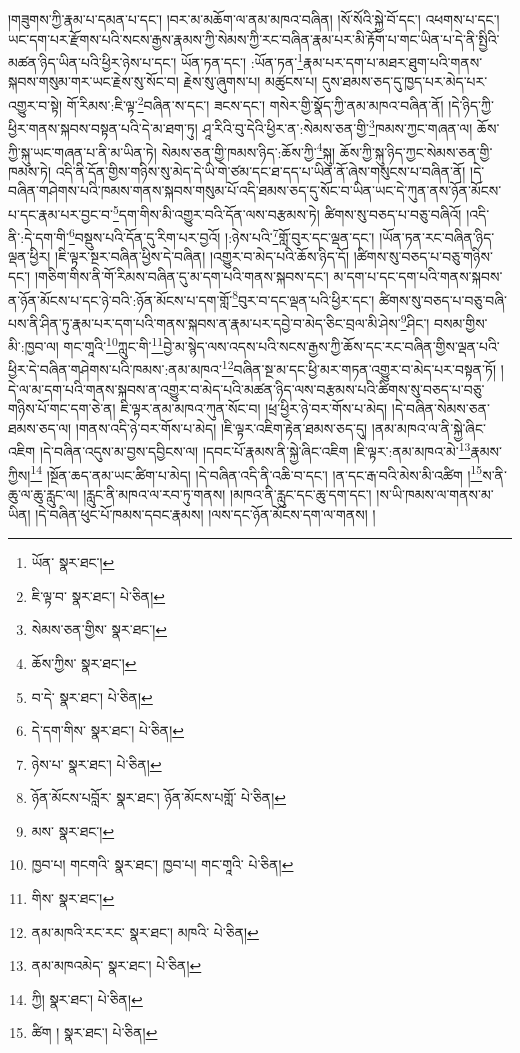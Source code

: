 །གཟུགས་ཀྱི་རྣམ་པ་དམན་པ་དང་། །བར་མ་མཆོག་ལ་ནམ་མཁའ་བཞིན། །སོ་སོའི་སྐྱེ་བོ་དང་། འཕགས་པ་དང་། ཡང་དག་པར་རྫོགས་པའི་སངས་རྒྱས་རྣམས་ཀྱི་སེམས་ཀྱི་རང་བཞིན་རྣམ་པར་མི་རྟོག་པ་གང་ཡིན་པ་དེ་ནི་སྤྱིའི་མཚན་ཉིད་ཡིན་པའི་ཕྱིར་ཉེས་པ་དང་། ཡོན་ཏན་དང་། :ཡོན་ཏན་\footnote{ཡོན་  སྣར་ཐང་། }རྣམ་པར་དག་པ་མཐར་ཐུག་པའི་གནས་སྐབས་གསུམ་གར་ཡང་རྗེས་སུ་སོང་བ། རྗེས་སུ་ཞུགས་པ། མཚུངས་པ། དུས་ཐམས་ཅད་དུ་ཁྱད་པར་མེད་པར་འགྱུར་བ་སྟེ། གོ་རིམས་:ཇི་ལྟ་\footnote{ཇི་ལྟ་བ་  སྣར་ཐང་།  པེ་ཅིན། }བཞིན་ས་དང་། ཟངས་དང་། གསེར་གྱི་སྣོད་ཀྱི་ནམ་མཁའ་བཞིན་ནོ། །དེ་ཉིད་ཀྱི་ཕྱིར་གནས་སྐབས་བསྟན་པའི་དེ་མ་ཐག་ཏུ། ཤཱ་རིའི་བུ་དེའི་ཕྱིར་ན་:སེམས་ཅན་གྱི་\footnote{སེམས་ཅན་གྱིས་  སྣར་ཐང་། }ཁམས་ཀྱང་གཞན་ལ། ཆོས་ཀྱི་སྐུ་ཡང་གཞན་པ་ནི་མ་ཡིན་ཏེ། སེམས་ཅན་གྱི་ཁམས་ཉིད་:ཆོས་ཀྱི་\footnote{ཆོས་ཀྱིས་  སྣར་ཐང་། }སྐུ། ཆོས་ཀྱི་སྐུ་ཉིད་ཀྱང་སེམས་ཅན་གྱི་ཁམས་ཏེ། འདི་ནི་དོན་གྱིས་གཉིས་སུ་མེད་དེ་ཡི་གེ་ཙམ་དང་ཐ་དད་པ་ཡིན་ནོ་ཞེས་གསུངས་པ་བཞིན་ནོ། །དེ་བཞིན་གཤེགས་པའི་ཁམས་གནས་སྐབས་གསུམ་པོ་འདི་ཐམས་ཅད་དུ་སོང་བ་ཡིན་ཡང་དེ་ཀུན་ནས་ཉོན་མོངས་པ་དང་རྣམ་པར་བྱང་བ་\footnote{བ་དེ་  སྣར་ཐང་།  པེ་ཅིན། }དག་གིས་མི་འགྱུར་བའི་དོན་ལས་བརྩམས་ཏེ། ཚིགས་སུ་བཅད་པ་བཅུ་བཞིའོ། །འདི་ནི་:དེ་དག་གི་\footnote{དེ་དག་གིས་  སྣར་ཐང་།  པེ་ཅིན། }བསྡུས་པའི་དོན་དུ་རིག་པར་བྱའོ། །:ཉེས་པའི་\footnote{ཉེས་པ་  སྣར་ཐང་།  པེ་ཅིན། }གློ་བུར་དང་ལྡན་དང་། །ཡོན་ཏན་རང་བཞིན་ཉིད་ལྡན་ཕྱིར། །ཇི་ལྟར་སྔར་བཞིན་ཕྱིས་དེ་བཞིན། །འགྱུར་བ་མེད་པའི་ཆོས་ཉིད་དོ། །ཚིགས་སུ་བཅད་པ་བཅུ་གཉིས་དང་། །གཅིག་གིས་ནི་གོ་རིམས་བཞིན་དུ་མ་དག་པའི་གནས་སྐབས་དང་། མ་དག་པ་དང་དག་པའི་གནས་སྐབས་ན་ཉོན་མོངས་པ་དང་ཉེ་བའི་:ཉོན་མོངས་པ་དག་གློ་\footnote{ཉོན་མོངས་པབློར་  སྣར་ཐང་། ཉོན་མོངས་པགློ་  པེ་ཅིན། }བུར་བ་དང་ལྡན་པའི་ཕྱིར་དང་། ཚིགས་སུ་བཅད་པ་བཅུ་བཞི་པས་ནི་ཤིན་ཏུ་རྣམ་པར་དག་པའི་གནས་སྐབས་ན་རྣམ་པར་དབྱེ་བ་མེད་ཅིང་བྲལ་མི་ཤེས་\footnote{མས་  སྣར་ཐང་། }ཤིང་། བསམ་གྱིས་མི་:ཁྱབ་ལ། གང་གཱའི་\footnote{ཁྱབ་པ། གངགའི་  སྣར་ཐང་། ཁྱབ་པ། གང་གཱའི་  པེ་ཅིན། }ཀླུང་གི་\footnote{གིས་  སྣར་ཐང་། }བྱེ་མ་སྙེད་ལས་འདས་པའི་སངས་རྒྱས་ཀྱི་ཆོས་དང་རང་བཞིན་གྱིས་ལྡན་པའི་ཕྱིར་དེ་བཞིན་གཤེགས་པའི་ཁམས་:ནམ་མཁའ་\footnote{ནམ་མཁའི་རང་རང་  སྣར་ཐང་། མཁའི་  པེ་ཅིན། }བཞིན་སྔ་མ་དང་ཕྱི་མར་གཏན་འགྱུར་བ་མེད་པར་བསྟན་ཏོ། །དེ་ལ་མ་དག་པའི་གནས་སྐབས་ན་འགྱུར་བ་མེད་པའི་མཚན་ཉིད་ལས་བརྩམས་པའི་ཚིགས་སུ་བཅད་པ་བཅུ་གཉིས་པོ་གང་དག་ཅེ་ན། ཇི་ལྟར་ནམ་མཁའ་ཀུན་སོང་བ། །ཕྲ་ཕྱིར་ཉེ་བར་གོས་པ་མེད། །དེ་བཞིན་སེམས་ཅན་ཐམས་ཅད་ལ། །གནས་འདི་ཉེ་བར་གོས་པ་མེད། །ཇི་ལྟར་འཇིག་རྟེན་ཐམས་ཅད་དུ། །ནམ་མཁའ་ལ་ནི་སྐྱེ་ཞིང་འཇིག །དེ་བཞིན་འདུས་མ་བྱས་དབྱིངས་ལ། །དབང་པོ་རྣམས་ནི་སྐྱེ་ཞིང་འཇིག །ཇི་ལྟར་:ནམ་མཁའ་མེ་\footnote{ནམ་མཁའམེད་  སྣར་ཐང་།  པེ་ཅིན། }རྣམས་ཀྱིས།\footnote{ཀྱི།  སྣར་ཐང་།  པེ་ཅིན། } །སྔོན་ཆད་ནམ་ཡང་ཚིག་པ་མེད། །དེ་བཞིན་འདི་ནི་འཆི་བ་དང་། །ན་དང་རྒ་བའི་མེས་མི་འཚིག །\footnote{ཚིག །  སྣར་ཐང་།  པེ་ཅིན། }ས་ནི་ཆུ་ལ་ཆུ་རླུང་ལ། །རླུང་ནི་མཁའ་ལ་རབ་ཏུ་གནས། །མཁའ་ནི་རླུང་དང་ཆུ་དག་དང་། །ས་ཡི་ཁམས་ལ་གནས་མ་ཡིན། །དེ་བཞིན་ཕུང་པོ་ཁམས་དབང་རྣམས། །ལས་དང་ཉོན་མོངས་དག་ལ་གནས། །
